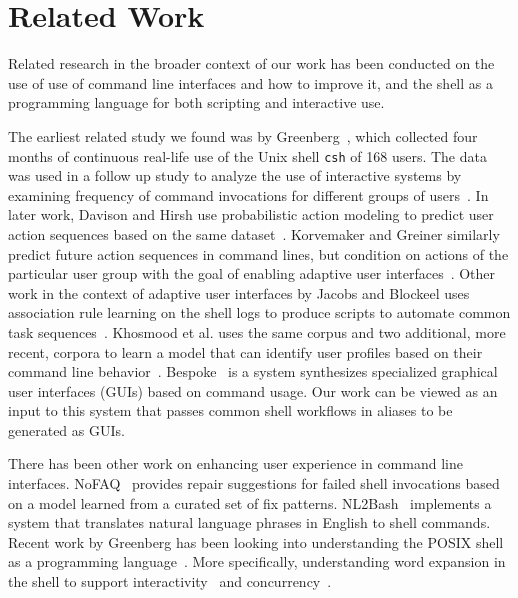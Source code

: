 \section{Related Work}

Related research in the broader context of our work has been conducted on the use of use of command line interfaces and how to improve it, and the shell as a programming language for both scripting and interactive use. 

The earliest related study we found was by Greenberg~\cite{greenberg:88a}, which collected four months of continuous real-life use of the Unix shell \verb|csh| of 168 users. 
The data was used in a follow up study to analyze the use of interactive systems by examining frequency of command invocations for different groups of users~\cite{greenberg:88b}.
In later work, Davison and Hirsh use probabilistic action modeling to predict user action sequences based on the same dataset~\cite{davison:98}.
Korvemaker and Greiner similarly predict future action sequences in command lines, but condition on actions of the particular user group with the goal of enabling adaptive user interfaces~\cite{korvemaker:00}.
Other work in the context of adaptive user interfaces by Jacobs and Blockeel uses association rule learning on the shell logs to produce scripts to automate common task sequences~\cite{jacobs:01}.
Khosmood et al. uses the same corpus and two additional, more recent, corpora to learn a model that can identify user profiles based on their command line behavior~\cite{khosmood:14}.
Bespoke~\cite{bespoke:19} is a system synthesizes specialized graphical user interfaces (GUIs) based on command usage.
Our work can be viewed as an input to this system that passes common shell workflows in aliases to be generated as GUIs.

There has been other work on enhancing user experience in command line interfaces.
NoFAQ~\cite{dantoni:17} provides repair suggestions for failed shell invocations based on a model learned from a curated set of fix patterns.
NL2Bash~\cite{lin:18} implements a system that translates natural language phrases in English to shell commands.
Recent work by Greenberg has been looking into understanding the POSIX shell as a programming language~\cite{greenberg:17}.
More specifically, understanding word expansion in the shell to support interactivity~\cite{greenberg:18a} and concurrency~\cite{greenberg:18b}.
